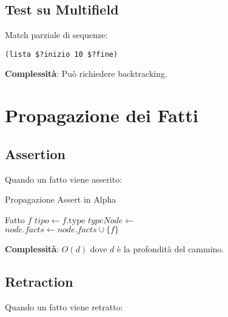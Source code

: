 \subsection{Test su Multifield}

Match parziale di sequenze:

\begin{lstlisting}[language=CLIPS]
(lista $?inizio 10 $?fine)
\end{lstlisting}

\textbf{Complessità}: Può richiedere backtracking.

\section{Propagazione dei Fatti}

\subsection{Assertion}

Quando un fatto viene asserito:

\begin{algorithm}
\caption{Propagazione Assert in Alpha}
\begin{algorithmic}[1]
\Require Fatto $f$
  \State $tipo \gets f.\text{type}$
  \State $typeNode \gets $ 
    \State \Return {}
  \EndIf
  \State {}
\EndFunction
\\
      \State \Return {}
    \EndIf
  \EndIf
    \State $node.facts \gets node.facts \cup \{f\}$
    \State {}
  \EndIf
    \State {}
  \EndFor
\EndFunction
\end{algorithmic}
\end{algorithm}

\textbf{Complessità}: $O(d)$ dove $d$ è la profondità del cammino.

\subsection{Retraction}

Quando un fatto viene retratto:

